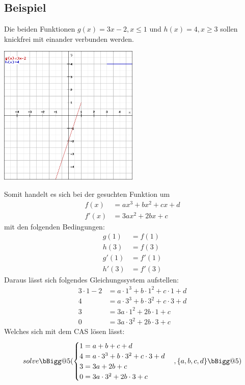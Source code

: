 \documentclass[a4paper,12pt]{article}
\makeatletter
\newcommand{\Vast}{\bBigg@{5}}
\makeatother
\begin{document}
\subsection{Beispiel}
Die beiden Funktionen $g(x) = 3x-2, x \leq 1$ und $h(x) = 4, x \geq 3$ sollen knickfrei mit einander verbunden werden.
\begin{center}
\includegraphics[width=0.5\textwidth]{image1.png}
\end{center}
Somit handelt es sich bei der gesuchten Funktion um
\begin{equation*}
\begin{split}
f(x) & = ax^3 + bx^2 + cx + d\\
f'(x) & = 3ax^2 + 2bx + c
\end{split}
\end{equation*}
mit den folgenden Bedingungen:
\begin{equation*}
\begin{split}
g(1) & = f(1)\\
h(3) & = f(3)\\
g'(1) & = f'(1)\\
h'(3) & = f'(3)
\end{split}
\end{equation*}
Daraus lässt sich folgendes Gleichungssystem aufstellen:
\begin{equation*}
\begin{split}
3\cdot 1-2 & = a\cdot 1^3 + b\cdot 1^2 + c\cdot 1 + d\\
4 & = a\cdot 3^3 + b\cdot 3^2 + c\cdot 3 + d\\
3 & = 3a\cdot 1^2 + 2b \cdot 1 + c\\
0 & = 3a\cdot 3^2 + 2b\cdot 3 + c
\end{split}
\end{equation*}
Welches sich mit dem CAS lösen lässt:
\[
solve \Vast(
\begin{cases}
1 = a + b + c + d\\
4 = a\cdot 3^3 + b\cdot 3^2 + c\cdot 3 + d\\
3 = 3a + 2b  + c\\
0 = 3a\cdot 3^2 + 2b\cdot 3 + c
\end{cases}
,\{a,b,c,d\}\Vast)
\]
\end{document}
